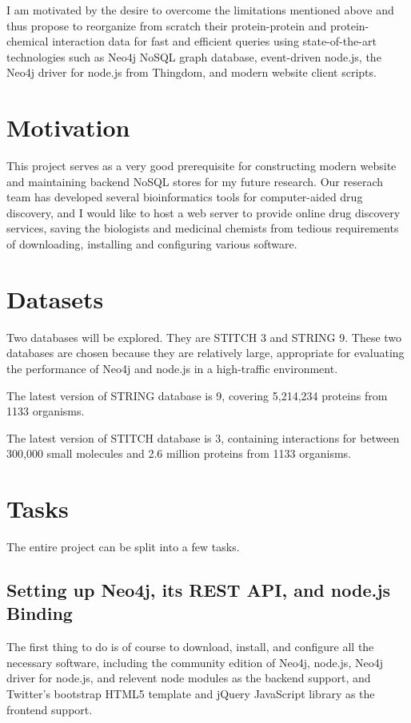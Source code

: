 \documentclass[10pt, conference, compsocconf]{../IEEEtran}
\begin{document}
I am motivated by the desire to overcome the limitations mentioned above and thus propose to reorganize from scratch their protein-protein and protein-chemical interaction data for fast and efficient queries using state-of-the-art technologies such as Neo4j NoSQL graph database, event-driven node.js, the Neo4j driver for node.js from Thingdom, and modern website client scripts.

\section{Motivation}

This project serves as a very good prerequisite for constructing modern website and maintaining backend NoSQL stores for my future research. Our reserach team has developed several bioinformatics tools for computer-aided drug discovery, and I would like to host a web server to provide online drug discovery services, saving the biologists and medicinal chemists from tedious requirements of downloading, installing and configuring various software.

\section{Datasets}

Two databases will be explored. They are STITCH 3 and STRING 9. These two databases are chosen because they are relatively large, appropriate for evaluating the performance of Neo4j and node.js in a high-traffic environment.

The latest version of STRING database is 9, covering 5,214,234 proteins from 1133 organisms.

The latest version of STITCH database is 3, containing interactions for between 300,000 small molecules and 2.6 million proteins from 1133 organisms.

\section{Tasks}

The entire project can be split into a few tasks.

\subsection{Setting up Neo4j, its REST API, and node.js Binding}

The first thing to do is of course to download, install, and configure all the necessary software, including the community edition of Neo4j, node.js, Neo4j driver for node.js, and relevent node modules as the backend support, and Twitter's bootstrap HTML5 template and jQuery JavaScript library as the frontend support.
\end{document}

